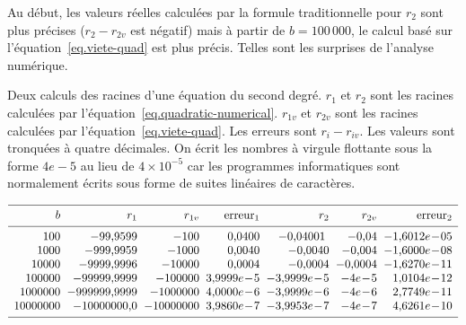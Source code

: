 Au début, les valeurs réelles calculées par la formule traditionnelle pour $r_2$ sont plus précises ($r_2-r_{2v}$ est négatif) mais à partir de $b=100\,000$, le calcul basé sur l'équation~\ref{eq.viete-quad} est plus précis. Telles sont les surprises de l'analyse numérique.

\begin{table}[htbp]
\footnotesize
\caption{Deux calculs des racines d'une équation du second degré. $r_1$ et $r_2$ sont les racines calculées par l'équation~\ref{eq.quadratic-numerical}. $r_{1v}$ et $r_{2v}$ sont les racines calculées par l'équation~\ref{eq.viete-quad}. Les erreurs sont $r_{i}-r_{iv}$. Les valeurs sont tronquées à quatre décimales.
On écrit les nombres à virgule flottante sous la forme $4e-5$ au lieu de $4\times 10^{-5}$ car les programmes informatiques sont normalement écrits sous forme de suites linéaires de caractères.} \label{t.quadratic}
\[
\begin{array}{r@{\hspace{2mm}}r@{\hspace{2mm}}r@{\hspace{2mm}}r@{\hspace{2mm}}r@{\hspace{2mm}}r@{\hspace{2mm}}r}
\hline
\noalign{\smallskip}
b & r_1 & r_{1v} & \mathrm{erreur}_1 & r_2 & r_{2v} & \mathrm{erreur}_2\\
\noalign{\smallskip}\hline\noalign{\smallskip}
100  &  -\mbox{99,9599}  &  -100  &  \mbox{0,0400}  &  -\mbox{0,04001}\  &  -\mbox{0,04}  &  -\mbox{1,6012}e\!-\!05\\
1000  &  -\mbox{999,9959}  &  -1000  &  \mbox{0,0040}  &  -\mbox{0,0040}  &  -\mbox{0,004}  &  -\mbox{1,6000}e\!-\!08\\
10000  &  -\mbox{9999,9996}  &  -10000  &  \mbox{0,0004}  &  -\mbox{0,0004}  &  -\mbox{0,0004}  &  -\mbox{1,6270}e\!-\!11\\
100000  &  -\mbox{99999,9999}  &  -100000  &  \mbox{3,9999}e\!-\!5  &  -\mbox{3,9999}e\!-\!5  &  -4e\!-\!5  &  \mbox{1,0104}e\!-\!12\\
1000000  &  -\mbox{999999,9999}  &  -1000000  &  \mbox{4,0000}e\!-\!6  &  -\mbox{3,9999}e\!-\!6  &  -4e\!-\!6  &  \mbox{2,7749}e\!-\!11\\
10000000  &  -\mbox{10000000,0}  &  -10000000  &  \mbox{3,9860}e\!-\!7  &  -\mbox{3,9953}e\!-\!7  &  -4e\!-\!7  &  \mbox{4,6261}e\!-\!10\\
 \noalign{\smallskip}
 \hline
\end{array}
\]
\end{table}


